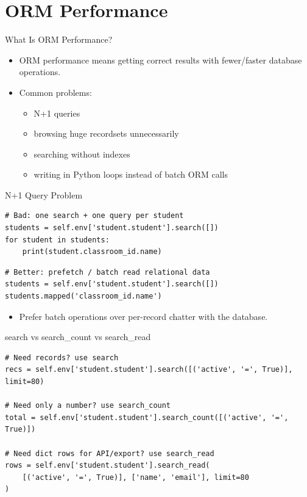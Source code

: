 \section{ORM Performance}


\begin{frame}[fragile]{What Is ORM Performance?}
	\begin{itemize}
		\item ORM performance means getting correct results with fewer/faster database operations.
		\item Common problems:
		\begin{itemize}
			\item N+1 queries
			\item browsing huge recordsets unnecessarily
			\item searching without indexes
			\item writing in Python loops instead of batch ORM calls
		\end{itemize}
	\end{itemize}
\end{frame}

\begin{frame}[fragile]{N+1 Query Problem}
\begin{lstlisting}
# Bad: one search + one query per student
students = self.env['student.student'].search([])
for student in students:
	print(student.classroom_id.name)
\end{lstlisting}
\begin{lstlisting}
# Better: prefetch / batch read relational data
students = self.env['student.student'].search([])
students.mapped('classroom_id.name')
\end{lstlisting}
	\begin{itemize}
		\item Prefer batch operations over per-record chatter with the database.
	\end{itemize}
\end{frame}

\begin{frame}[fragile]{search vs search\_count vs search\_read}
\begin{lstlisting}
# Need records? use search
recs = self.env['student.student'].search([('active', '=', True)], limit=80)

# Need only a number? use search_count
total = self.env['student.student'].search_count([('active', '=', True)])

# Need dict rows for API/export? use search_read
rows = self.env['student.student'].search_read(
	[('active', '=', True)], ['name', 'email'], limit=80
)
\end{lstlisting}
\end{frame}


